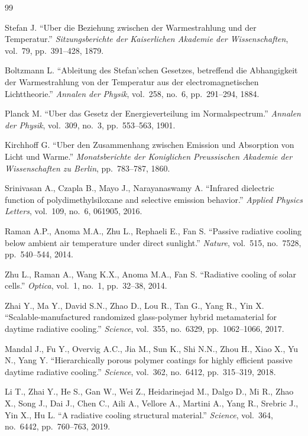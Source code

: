 \begin{thebibliography}{99}

 Stefan J. ``Uber die Beziehung zwischen der Warmestrahlung und der Temperatur.'' \emph{Sitzungsberichte der Kaiserlichen Akademie der Wissenschaften}, vol.~79, pp.~391--428, 1879.

 Boltzmann L. ``Ableitung des Stefan'schen Gesetzes, betreffend die Abhangigkeit der Warmestrahlung von der Temperatur aus der electromagnetischen Lichttheorie.'' \emph{Annalen der Physik}, vol.~258, no.~6, pp.~291--294, 1884.

 Planck M. ``Uber das Gesetz der Energieverteilung im Normalspectrum.'' \emph{Annalen der Physik}, vol.~309, no.~3, pp.~553--563, 1901.

 Kirchhoff G. ``Uber den Zusammenhang zwischen Emission und Absorption von Licht und Warme.'' \emph{Monatsberichte der Koniglichen Preussischen Akademie der Wissenschaften zu Berlin}, pp.~783--787, 1860.

 Srinivasan A., Czapla B., Mayo J., Narayanaswamy A. ``Infrared dielectric function of polydimethylsiloxane and selective emission behavior.'' \emph{Applied Physics Letters}, vol.~109, no.~6, 061905, 2016.

 Raman A.P., Anoma M.A., Zhu L., Rephaeli E., Fan S. ``Passive radiative cooling below ambient air temperature under direct sunlight.'' \emph{Nature}, vol.~515, no.~7528, pp.~540--544, 2014.

 Zhu L., Raman A., Wang K.X., Anoma M.A., Fan S. ``Radiative cooling of solar cells.'' \emph{Optica}, vol.~1, no.~1, pp.~32--38, 2014.

 Zhai Y., Ma Y., David S.N., Zhao D., Lou R., Tan G., Yang R., Yin X. ``Scalable-manufactured randomized glass-polymer hybrid metamaterial for daytime radiative cooling.'' \emph{Science}, vol.~355, no.~6329, pp.~1062--1066, 2017.

 Mandal J., Fu Y., Overvig A.C., Jia M., Sun K., Shi N.N., Zhou H., Xiao X., Yu N., Yang Y. ``Hierarchically porous polymer coatings for highly efficient passive daytime radiative cooling.'' \emph{Science}, vol.~362, no.~6412, pp.~315--319, 2018.

 Li T., Zhai Y., He S., Gan W., Wei Z., Heidarinejad M., Dalgo D., Mi R., Zhao X., Song J., Dai J., Chen C., Aili A., Vellore A., Martini A., Yang R., Srebric J., Yin X., Hu L. ``A radiative cooling structural material.'' \emph{Science}, vol.~364, no.~6442, pp.~760--763, 2019.


\end{thebibliography}
